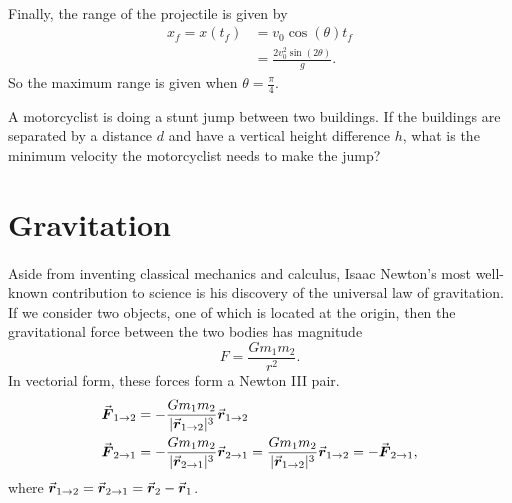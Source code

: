 \documentclass[../newtonian_mechanics.tex]{subfiles}
\begin{document}
        \paragraph{}
        Finally, the range of the projectile is given by
        \begin{align}
            x_f = x(t_f) &= v_0\cos(\theta)t_f\\
            &= \frac{2v_0^2\sin(2\theta)}{g}.
        \end{align}
        So the maximum range is given when $\theta=\frac{\pi}{4}$.


        \begin{example}
            A motorcyclist is doing a stunt jump between two buildings.
            If the buildings are separated by a distance $d$ and have a vertical height difference $h$, what is the minimum velocity the motorcyclist needs to make the jump?
        \end{example}

    \section{Gravitation}
        \paragraph{}
        Aside from inventing classical mechanics and calculus, Isaac Newton's most well-known contribution to science is his discovery of the universal law of gravitation.
        If we consider two objects, one of which is located at the origin, then the gravitational force between the two bodies has magnitude
        \begin{equation}
            F=\frac{Gm_1m_2}{r^2}.
        \end{equation}
        In vectorial form, these forces form a Newton III pair.
        \begin{align}
            \vec{\boldsymbol F}_{1\to2}&=-\frac{Gm_1m_2}{\lvert\vec{\boldsymbol r}_{1\to2}\rvert^3}\vec{\boldsymbol r}_{1\to2}\\
            \vec{\boldsymbol F}_{2\to1}&=-\frac{Gm_1m_2}{\lvert\vec{\boldsymbol r}_{2\to1}\rvert^3}\vec{\boldsymbol r}_{2\to1}=\frac{Gm_1m_2}{\lvert\vec{\boldsymbol r}_{1\to2}\rvert^3}\vec{\boldsymbol r}_{1\to2}=-\vec{\boldsymbol F}_{2\to1},
        \end{align}
        where $\vec{\boldsymbol r}_{1\to2}=\vec{\boldsymbol r}_{2\to1}=\vec{\boldsymbol r}_2-\vec{\boldsymbol r}_1$.
        
\end{document}
